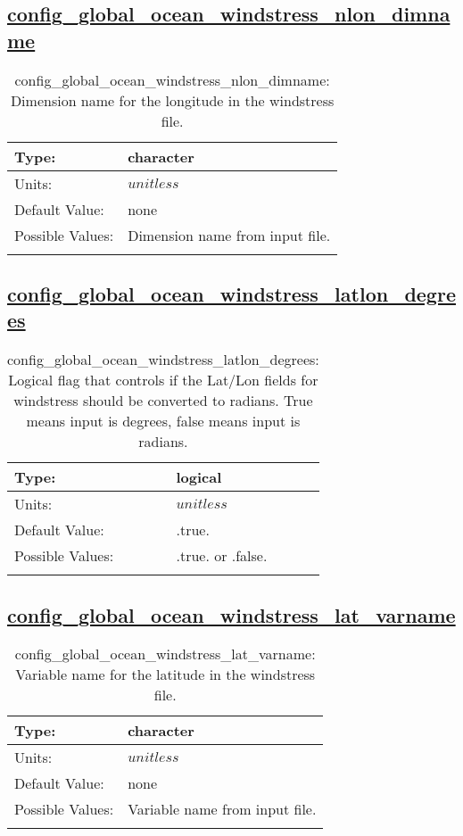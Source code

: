\subsection[config\_global\_ocean\_windstress\_nlon\_dimname]{\hyperref[sec:nm_tab_global_ocean]{config\_global\_ocean\_windstress\_nlon\_dimname}}
\label{subsec:nm_sec_config_global_ocean_windstress_nlon_dimname}
\begin{center}
\begin{longtable}{| p{2.0in} || p{4.0in} |}
    \hline
    Type: & character \\
    \hline
    Units: & $unitless$ \\
    \hline
    Default Value: & none \\
    \hline
    Possible Values: & Dimension name from input file. \\
    \hline
    \caption{config\_global\_ocean\_windstress\_nlon\_dimname: Dimension name for the longitude in the windstress file.}
\end{longtable}
\end{center}
\subsection[config\_global\_ocean\_windstress\_latlon\_degrees]{\hyperref[sec:nm_tab_global_ocean]{config\_global\_ocean\_windstress\_latlon\_degrees}}
\label{subsec:nm_sec_config_global_ocean_windstress_latlon_degrees}
\begin{center}
\begin{longtable}{| p{2.0in} || p{4.0in} |}
    \hline
    Type: & logical \\
    \hline
    Units: & $unitless$ \\
    \hline
    Default Value: & .true. \\
    \hline
    Possible Values: & .true. or .false. \\
    \hline
    \caption{config\_global\_ocean\_windstress\_latlon\_degrees: Logical flag that controls if the Lat/Lon fields for windstress should be converted to radians. True means input is degrees, false means input is radians.}
\end{longtable}
\end{center}
\subsection[config\_global\_ocean\_windstress\_lat\_varname]{\hyperref[sec:nm_tab_global_ocean]{config\_global\_ocean\_windstress\_lat\_varname}}
\label{subsec:nm_sec_config_global_ocean_windstress_lat_varname}
\begin{center}
\begin{longtable}{| p{2.0in} || p{4.0in} |}
    \hline
    Type: & character \\
    \hline
    Units: & $unitless$ \\
    \hline
    Default Value: & none \\
    \hline
    Possible Values: & Variable name from input file. \\
    \hline
    \caption{config\_global\_ocean\_windstress\_lat\_varname: Variable name for the latitude in the windstress file.}
\end{longtable}
\end{center}

